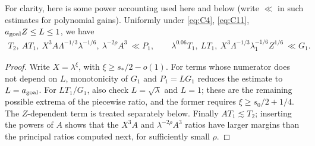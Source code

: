 \begin{lemma}\label{bud:power-margins}

For clarity, here is some power accounting used here and below (write \(\ll\) in such estimates for polynomial gains). Uniformly under \eqref{eq:C4}, \eqref{eq:C11}, \(a_{\rm goal}Z\le L\le1\), we have
\[
\begin{gathered}
 T_2,\ A T_1,\ X^3 A\Lambda^{-1/3}\lambda^{-1/6},
          \ \lambda^{-2\rho}A^3\ \ll P_1,\qquad
 \lambda^{0.06}T_1,\ L T_1,\ X^3\Lambda^{-1/3}\lambda_1^{-1/6}Z^{1/6}
                 \ \ll G_1 .                                             \tag{C18}\label{eq:C18}
\end{gathered}
\]

\end{lemma}\begin{proof}

Write \(X=\lambda^\xi\), with
\(\xi\ge s_*/2-o(1)\). For terms whose numerator does not depend
on \(L\), monotonicity of \(G_1\) and \(P_1=LG_1\) reduces
the estimate to \(L=a_{\rm goal}\). For \(LT_1/G_1\), also
check \(L=\sqrt\lambda\) and \(L=1\); these are the remaining
possible extrema of the piecewise ratio, and the former requires
\(\xi\ge s_0/2+1/4\). The \(Z\)-dependent term is treated
separately below. Finally \(AT_1\lesssim T_2\); inserting the
powers of \(A\) shows that the \(X^3A\) and
\(\lambda^{-2\rho}A^3\) ratios have larger margins than the
principal ratios computed next, for sufficiently small \(\rho\).


\end{proof}
